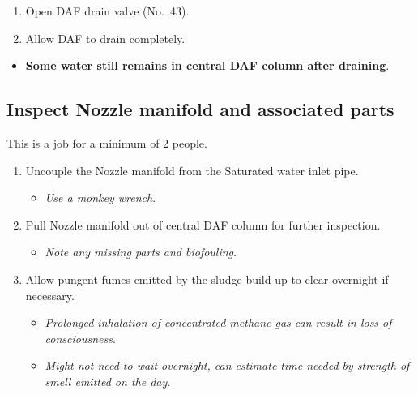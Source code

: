 \documentclass[
  letterpaper,
  DIV=11,
  numbers=noendperiod]{scrreprt}
\providecommand{\tightlist}{%
  \setlength{\itemsep}{0pt}\setlength{\parskip}{0pt}}\usepackage{longtable,booktabs,array}
\begin{document}
\begin{enumerate}
\def\labelenumi{\arabic{enumi}.}
\setcounter{enumi}{6}
\tightlist
\item
  Open DAF drain valve (No.~43).
\item
  Allow DAF to drain completely.
\end{enumerate}

\begin{itemize}
\tightlist
\item
  \textbf{Some water still remains in central DAF column after
  draining}.
\end{itemize}

\hypertarget{inspect-nozzle-manifold-and-associated-parts}{%
\subsection{Inspect Nozzle manifold and associated
parts}\label{inspect-nozzle-manifold-and-associated-parts}}

{This is a job for a minimum of 2 people}.

\begin{enumerate}
\def\labelenumi{\arabic{enumi}.}
\setcounter{enumi}{8}
\tightlist
\item
  Uncouple the Nozzle manifold from the Saturated water inlet pipe.

  \begin{itemize}
  \tightlist
  \item
    \emph{Use a monkey wrench}.
  \end{itemize}
\item
  Pull Nozzle manifold out of central DAF column for further inspection.

  \begin{itemize}
  \tightlist
  \item
    \emph{Note any missing parts and biofouling}.
  \end{itemize}
\item
  Allow pungent fumes emitted by the sludge build up to clear overnight
  if necessary.

  \begin{itemize}
  \tightlist
  \item
    \emph{Prolonged inhalation of concentrated methane gas can result in
    loss of consciousness}.
  \item
    \emph{Might not need to wait overnight, can estimate time needed by
    strength of smell emitted on the day}.
  \end{itemize}
\end{enumerate}
\end{document}
